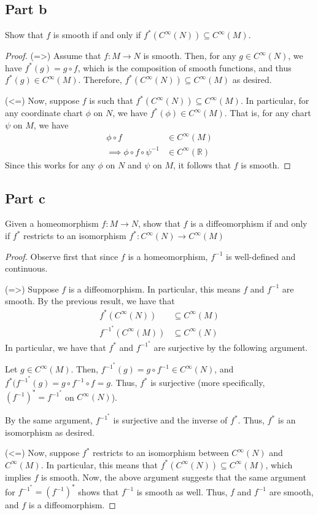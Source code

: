 \documentclass[fontsize=11pt]{scrartcl} %
\numberwithin{equation}{section} %
\numberwithin{figure}{section} %
\numberwithin{table}{section} %
\newcommand{\R}{\mathbb{R}}
\begin{document}
\subsection*{Part b}
Show that $f$ is smooth if and only if $f^*(C^{\infty}(N))\subseteq C^{\infty}(M)$.
\\
\begin{proof}
(=>)
Assume that $f:M\to N$ is smooth. Then, for any $g\in C^{\infty}(N)$, we have
$f^*(g) = g\circ f$, which is the composition of smooth functions, and thus
$f^*(g)\in C^{\infty}(M)$. Therefore, $f^*(C^{\infty}(N))\subseteq C^{\infty}(M)$ as desired. 

(<=)
Now, suppose $f$ is such that $f^*(C^{\infty}(N))\subseteq C^{\infty}(M)$. In particular,
for any coordinate chart $\phi$ on $N$, we have $f^*(\phi)\in C^{\infty}(M)$. That is,
for any chart $\psi$ on $M$, we have
\[
\begin{aligned}
\phi\circ f &\in C^{\infty}(M)\\
\implies \phi\circ f\circ\psi^{-1} &\in C^{\infty}(\R)
\end{aligned}
\]
Since this works for any $\phi$ on $N$ and $\psi$ on $M$, it follows that $f$ is smooth.
\end{proof}

\subsection*{Part c}
Given a homeomorphism $f:M\to N$, show that $f$ is a diffeomorphism if and only if
$f^*$ restricts to an isomorphism $f^*:C^{\infty}(N)\to C^{\infty}(M)$
\\
\begin{proof}
Observe first that since $f$ is a homeomorphism, $f^{-1}$ is well-defined and continuous.

(=>) Suppose $f$ is a diffeomorphism. In particular, this means $f$ and $f^{-1}$ are smooth.
By the previous result, we have that
\[
\begin{aligned}
f^*(C^{\infty}(N)) &\subseteq C^{\infty}(M)\\
f^{-1^*}(C^{\infty}(M)) &\subseteq C^{\infty}(N)
\end{aligned}
\]
In particular, we have that $f^*$ and $f^{-1^*}$ are surjective by the following argument.

Let $g\in C^{\infty}(M)$. Then, $f^{-1^*}(g) = g\circ f^{-1} \in C^{\infty}(N)$, and
$f^*(f^{-1^*}(g) = g\circ f^{-1}\circ f = g$. Thus, $f^*$ is surjective (more specifically,
$(f^{-1})^* = f^{-1^*}$ on $C^{\infty}(N)$).

By the same argument, $f^{-1^*}$ is surjective and the inverse of $f^*$. Thus,
$f^*$ is an isomorphism as desired.

(<=)
Now, suppose $f^*$ restricts to an isomorphism between $C^{\infty}(N)$ and $C^{\infty}(M)$.
In particular, this means that
$f^*(C^{\infty}(N)) \subseteq C^{\infty}(M)$, which implies $f$ is smooth. Now, the above
argument suggests that the same argument for $f^{-1^*} = (f^{-1})^*$ shows that $f^{-1}$ is smooth
as well. Thus, $f$ and $f^{-1}$ are smooth, and $f$ is a diffeomorphism.
\end{proof}
\end{document}

